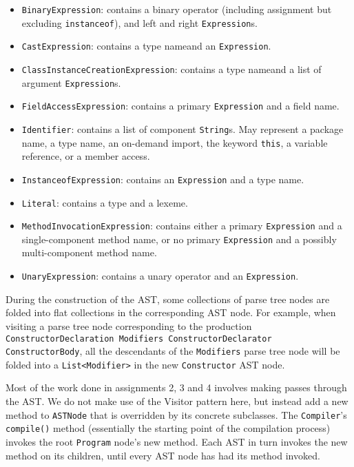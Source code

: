 \documentclass[12pt]{article}
\newcommand{\code}[1]{\texttt{#1}}
\begin{document}
\begin{itemize}
\begin{itemize}
\begin{itemize}
\begin{itemize}
\item \code{BinaryExpression}: contains a binary operator (including assignment but excluding \code{instanceof}), and left and right \code{Expression}s.
\item \code{CastExpression}: contains a type name\footnotemark[\value{footnote}] and an \code{Expression}.
\item \code{ClassInstanceCreationExpression}: contains a type name\footnotemark[\value{footnote}] and a list of argument \code{Expression}s.
\item \code{FieldAccessExpression}: contains a primary \code{Expression} and a field name.
\item \code{Identifier}: contains a list of component \code{String}s. May represent a package name, a type name, an on-demand import, the keyword \code{this}, a variable reference, or a member access.
\item \code{InstanceofExpression}: contains an \code{Expression} and a type name\footnotemark[\value{footnote}].
\item \code{Literal}: contains a type and a lexeme.
\item \code{MethodInvocationExpression}: contains either a primary \code{Expression} and a single-component method name\footnotemark[\value{footnote}], or no primary \code{Expression} and a possibly multi-component method name\footnotemark[\value{footnote}].
\item \code{UnaryExpression}: contains a unary operator and an \code{Expression}.
\end{itemize}
\end{itemize}
\end{itemize}
\end{itemize}

During the construction of the AST, some collections of parse tree nodes are folded into flat collections in the corresponding AST node.  For example, when visiting a parse tree node corresponding to the production \code{ConstructorDeclaration Modifiers ConstructorDeclarator ConstructorBody}, all the descendants of the \code{Modifiers} parse tree node will be folded into a \code{List<Modifier>} in the new \code{Constructor} AST node.

Most of the work done in assignments 2, 3 and 4 involves making passes through the AST.  We do not make use of the Visitor pattern here, but instead add a new method to \code{ASTNode} that is overridden by its concrete subclasses.  The \code{Compiler}'s \code{compile()} method (essentially the starting point of the compilation process) invokes the root \code{Program} node's new method.  Each AST in turn invokes the new method on its children, until every AST node has had its method invoked.
\end{document}
